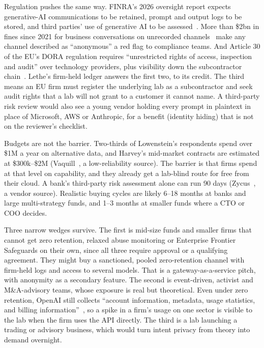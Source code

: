 \documentclass[10pt,a4paper]{article}
\begin{document}
Regulation pushes the same way. FINRA's 2026 oversight report expects generative-AI communications to be retained, prompt and output logs to be stored, and third parties' use of generative AI to be assessed~\cite{global-relay-finra-2026}. More than \$2bn in fines since 2021 for business conversations on unrecorded channels~\cite{american-banker-sec-fines} make any channel described as ``anonymous'' a red flag to compliance teams. And Article 30 of the EU's DORA regulation requires ``unrestricted rights of access, inspection and audit'' over technology providers, plus visibility down the subcontractor chain~\cite{advisera-dora-contractual}. Lethe's firm-held ledger answers the first two, to its credit. The third means an EU firm must register the underlying lab as a subcontractor and seek audit rights that a lab will not grant to a customer it cannot name. A third-party risk review would also see a young vendor holding every prompt in plaintext in place of Microsoft, AWS or Anthropic, for a benefit (identity hiding) that is not on the reviewer's checklist.

Budgets are not the barrier. Two-thirds of Lowenstein's respondents spend over \$1M a year on alternative data, and Harvey's mid-market contracts are estimated at \$300k--\$2M (Vaquill~\cite{vaquill-harvey-pricing}, a low-reliability source). The barrier is that firms spend at that level on capability, and they already get a lab-blind route for free from their cloud. A bank's third-party risk assessment alone can run 90 days (Zycus~\cite{zycus}, a vendor source). Realistic buying cycles are likely 6--18 months at banks and large multi-strategy funds, and 1--3 months at smaller funds where a CTO or COO decides.

Three narrow wedges survive. The first is mid-size funds and smaller firms that cannot get zero retention, relaxed abuse monitoring or Enterprise Frontier Safeguards on their own, since all three require approval or a qualifying agreement. They might buy a sanctioned, pooled zero-retention channel with firm-held logs and access to several models. That is a gateway-as-a-service pitch, with anonymity as a secondary feature. The second is event-driven, activist and M\&A-advisory teams, whose exposure is real but theoretical. Even under zero retention, OpenAI still collects ``account information, metadata, usage statistics, and billing information''~\cite{openai-developer-docs-your}, so a spike in a firm's usage on one sector is visible to the lab when the firm uses the API directly. The third is a lab launching a trading or advisory business, which would turn intent privacy from theory into demand overnight.
\end{document}
